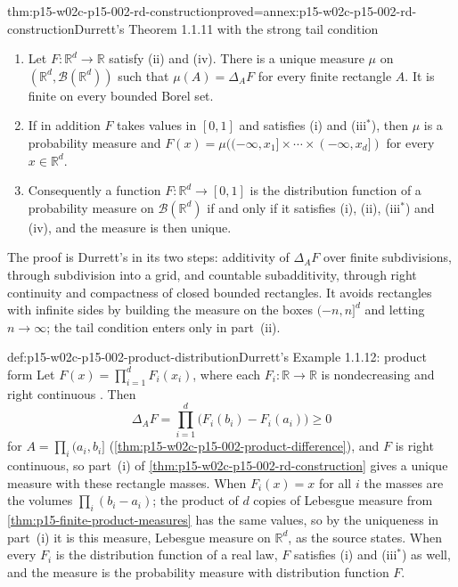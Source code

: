 \begin{hbtheorem}{thm:p15-w02c-p15-002-rd-construction}{proved=annex:p15-w02c-p15-002-rd-construction}{Durrett's Theorem 1.1.11 with the strong tail condition}
\begin{enumerate}
\item Let \(F:\mathbb R^d\to\mathbb R\) satisfy (ii) and (iv). There is a
      unique measure \(\mu\) on \((\mathbb R^d,\mathcal B(\mathbb R^d))\)
      such that \(\mu(A)=\Delta_AF\) for every finite rectangle \(A\).
      It is finite on every bounded Borel set.
\item If in addition \(F\) takes values in \([0,1]\) and satisfies (i)
      and (iii\(^*\)), then \(\mu\) is a probability measure and
      \(F(x)=\mu((-\infty,x_1]\times\cdots\times(-\infty,x_d])\) for every
      \(x\in\mathbb R^d\).
\item Consequently a function \(F:\mathbb R^d\to[0,1]\) is the
      distribution function of a probability measure on
      \(\mathcal B(\mathbb R^d)\) if and only if it satisfies (i), (ii),
      (iii\(^*\)) and (iv), and the measure is then unique.
\end{enumerate}
\end{hbtheorem}

The proof is Durrett's in its two steps: additivity of \(\Delta_AF\) over
finite subdivisions, through subdivision into a grid, and countable
subadditivity, through right continuity and compactness of closed bounded
rectangles. It avoids rectangles with infinite sides by building the
measure on the boxes \((-n,n]^d\) and letting \(n\to\infty\); the tail
condition enters only in part~(ii).

\begin{hbexample}{def:p15-w02c-p15-002-product-distribution}{Durrett's Example 1.1.12: product form}
Let \(F(x)=\prod_{i=1}^dF_i(x_i)\), where each \(F_i:\mathbb R\to\mathbb R\)
is nondecreasing and right continuous
\cite[Example~1.1.12, p.~8]{DurrettPTEAuthor2019}. Then
\[
 \Delta_AF=\prod_{i=1}^d\bigl(F_i(b_i)-F_i(a_i)\bigr)\geq0
\]
for \(A=\prod_i(a_i,b_i]\)
(\cref{thm:p15-w02c-p15-002-product-difference}), and \(F\) is right
continuous, so part~(i) of \cref{thm:p15-w02c-p15-002-rd-construction}
gives a unique measure with these rectangle masses. When \(F_i(x)=x\) for
all \(i\) the masses are the volumes \(\prod_i(b_i-a_i)\); the product of
\(d\) copies of Lebesgue measure from
\cref{thm:p15-finite-product-measures} has the same values, so by the
uniqueness in part~(i) it is this measure, Lebesgue measure on
\(\mathbb R^d\), as the source states. When every \(F_i\) is the
distribution function of a real law, \(F\) satisfies (i) and (iii\(^*\))
as well, and the measure is the probability measure with distribution
function \(F\).
\end{hbexample}

